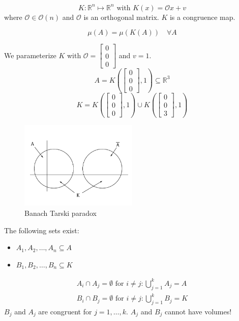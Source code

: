 \documentclass{article}
\begin{document}
\[ K: \mathbb R^n \mapsto \mathbb R^n \text{ with } K(x) = \mathcal O x + v \]
where $\mathcal O \in \mathcal O(n)$ and $\mathcal O$ is an orthogonal matrix.
$K$ is a congruence map.

\[ \mu(A) = \mu(K(A)) \quad \forall A \]

We parameterize $K$ with $\mathcal O = \begin{bmatrix} 0 \\ 0 \\ 0 \end{bmatrix}$ and $v = 1$.
\[ A = K(\begin{bmatrix} 0 \\ 0 \\ 0 \end{bmatrix}, 1) \subseteq \mathbb R^3 \]
\[ K = K(\begin{bmatrix} 0 \\ 0 \\ 0 \end{bmatrix}, 1) \cup K\left(\begin{bmatrix} 0 \\ 0 \\ 3 \end{bmatrix}, 1\right) \]

\begin{figure}[h]
  \begin{center}
    \includegraphics[width=0.5\textwidth]{img/08_bt_paradox.pdf}
    \caption{Banach Tarski paradox}
  \end{center}
\end{figure}

The following sets exist:
\begin{itemize}
  \item $A_1, A_2, \ldots, A_n \subseteq A$
  \item $B_1, B_2, \ldots, B_n \subseteq K$
\end{itemize}

\begin{align*}
  A_i \cap A_j = \emptyset \text{ for } i \neq j: \bigcup_{j=1}^k A_j = A \\
  B_i \cap B_j = \emptyset \text{ for } i \neq j: \bigcup_{j=1}^k B_j = K
\end{align*}
$B_j$ and $A_j$ are congruent for $j=1,\ldots,k$.
$A_j$ and $B_j$ cannot have volumes! %
\end{document}
